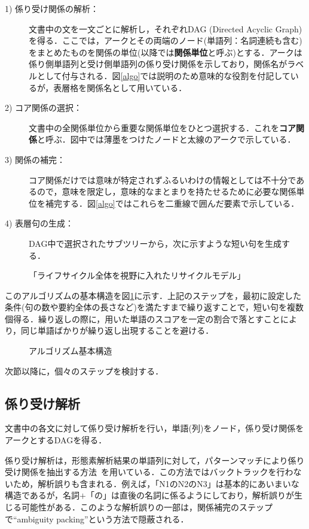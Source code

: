\begin{description}
 \item[1) 係り受け関係の解析：]
 文書中の文を一文ごとに解析し，それぞれDAG (Directed Acyclic Graph)を得る．ここでは，アークとその両端のノード(単語列：名詞連続も含む)をまとめたものを関係の単位(以降では{\bf 関係単位}と呼ぶ)とする．アークは係り側単語列と受け側単語列の係り受け関係を示しており，関係名がラベルとして付与される．図\ref{algo}では説明のため意味的な役割を付記しているが，表層格を関係名として用いている．

 \item[2) コア関係の選択：]
 文書中の全関係単位から重要な関係単位をひとつ選択する．これを{\bf コア関係}と呼ぶ．図中では薄墨をつけたノードと太線のアークで示している．

 \item[3) 関係の補完：]
 コア関係だけでは意味が特定されずふるいわけの情報としては不十分であるので，意味を限定し，意味的なまとまりを持たせるために必要な関係単位を補完する．図\ref{algo}ではこれらを二重線で囲んだ要素で示している．

 \item[4) 表層句の生成：]
 DAG中で選択されたサブツリーから，次に示すような短い句を生成する．
 \begin{center}
 「ライフサイクル全体を視野に入れたリサイクルモデル」
 \end{center}
\end{description}

このアルゴリズムの基本構造を図\ref{frame}に示す．上記のステップを，最初に設定した条件(句の数や要約全体の長さなど)を満たすまで繰り返すことで，短い句を複数個得る．繰り返しの際に，用いた単語のスコアを一定の割合で落とすことにより，同じ単語ばかりが繰り返し出現することを避ける．

\begin{figure}[htbp]
  \begin{center}
    \caption{アルゴリズム基本構造}
    \label{frame}
  \end{center}
\end{figure}


次節以降に，個々のステップを検討する．

\subsection{係り受け解析}
文書中の各文に対して係り受け解析を行い，単語(列)をノード，係り受け関係をアークとするDAGを得る．

係り受け解析は，形態素解析結果の単語列に対して，パターンマッチにより係り受け関係を抽出する方法~\cite{miyauchi95}を用いている．この方法ではバックトラックを行わないため，解析誤りも含まれる．例えば，「N1のN2のN3」は基本的にあいまいな構造であるが，名詞$+$「の」は直後の名詞に係るようにしており，解析誤りが生じる可能性がある．このような解析誤りの一部は，関係補完のステップで``ambiguity packing''という方法で隠蔽される．

